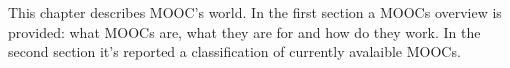 This chapter describes MOOC’s world.
In the first section a MOOCs overview is provided: what MOOCs are, what they are for and how do they work. In the second section it’s reported a classification of currently avalaible MOOCs.
